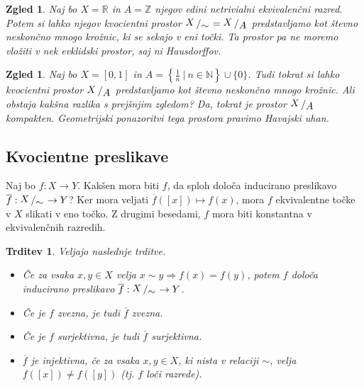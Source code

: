 \documentclass[10pt, a4paper]{article}
\newtheorem{trditev}[izr]{Trditev}
\newtheorem{zgled}[izr]{Zgled}
\newcommand{\N}{\mathbb {N}}
\newcommand{\Z}{\mathbb {Z}}
\newcommand{\R}{\mathbb {R}}
\newcommand{\quot}[2]{{\raisebox{0.1em}{$#1$}\left/\raisebox{-0.2em}{$#2$}\right.}}
\begin{document}
\begin{zgled}
    Naj bo $X = \R$ in $A = \Z$ njegov edini netrivialni ekvivalenčni razred.
    Potem si lahko njegov kvocientni prostor $\quot{X}{\sim} = \quot{X}{A}$ predstavljamo
    kot števno neskončno mnogo krožnic, ki se sekajo v eni točki. 
    Ta prostor pa ne moremo vložiti v nek evklidski prostor, saj ni Hausdorffov.
\end{zgled}

\begin{zgled}
    Naj bo $X = [0, 1]$ in $A = \left\lbrace \frac{1}{n}\ \Big|\ n \in \N \right\rbrace \cup \{0\}$.
    Tudi tokrat si lahko kvocientni prostor $\quot{X}{A}$ predstavljamo kot 
    števno neskončno mnogo krožnic. Ali obstaja kakšna razlika s prejšnjim zgledom?
    Da, tokrat je prostor $\quot{X}{A}$ kompakten.
    Geometrijski ponazoritvi tega prostora pravimo Havajski uhan.
    \begin{center}
    \end{center}
\end{zgled}

\subsection{Kvocientne preslikave}

Naj bo $f: X \to Y$. Kakšen mora biti $f$, da sploh določa inducirano preslikavo 
$\overline{f}: \quot{X}{\sim} \to Y$? Ker mora veljati $\overline{f}([x]) \mapsto f(x)$,
mora $f$ ekvivalentne točke v $X$ slikati v eno točko. Z drugimi besedami, $f$ mora biti konstantna v ekvivalenčnih razredih.

\begin{trditev}
    Veljajo naslednje trditve.
    \begin{itemize}
        \item Če za vsaka $x, y \in X$ velja $x \sim y \Rightarrow f(x) = f(y)$,
        potem $f$ določa inducirano preslikavo $\overline{f}: \quot{X}{\sim} \to Y$.
        \item Če je $f$ zvezna, je tudi $\overline{f}$ zvezna.
        \item Če je $f$ surjektivna, je tudi $\overline{f}$ surjektivna.
        \item $\overline{f}$ je injektivna, če za vsaka $x, y \in X$, ki nista v relaciji $\sim$, velja $f([x]) \neq f([y])$
        (tj. $f$ loči razrede).
    \end{itemize}
\end{trditev}
\end{document}
